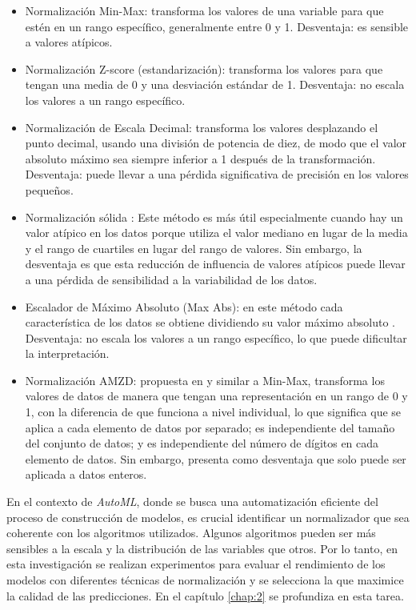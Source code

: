 \begin{itemize}
	\item Normalización Min-Max: transforma los valores de una variable para que estén en un rango específico, generalmente entre 0 y 1. Desventaja: es sensible a valores atípicos.
	\item Normalización Z-score (estandarización): transforma los valores para que tengan una media de 0 y una desviación estándar de 1. Desventaja: no escala los valores a un rango específico.
	\item Normalización de Escala Decimal: transforma los valores desplazando el punto decimal, usando una división de potencia de diez, de modo que el valor absoluto máximo sea siempre inferior a 1 después de la transformación. Desventaja: puede llevar a una pérdida significativa de precisión en los valores pequeños. 
	\item Normalización sólida \citep{polatgil2022investigation}: Este método es más útil especialmente cuando hay un valor atípico en los datos porque utiliza el valor mediano en lugar de la media y el rango de cuartiles en lugar del rango de valores. Sin embargo, la desventaja es que esta reducción de influencia de valores atípicos puede llevar a una pérdida de sensibilidad a la variabilidad de los datos.
	\item Escalador de Máximo Absoluto (Max Abs): en este método cada característica de los datos se obtiene dividiendo su valor máximo absoluto \citep{polatgil2022investigation}. Desventaja: no escala los valores a un rango específico, lo que puede dificultar la interpretación.
	\item Normalización AMZD: propuesta en \citep{patro2015normalization} y similar a Min-Max, transforma los valores de datos de manera que tengan una representación en un rango de 0 y 1, con la diferencia de que funciona a nivel individual, lo que significa que se aplica a cada elemento de datos por separado; es independiente del tamaño del conjunto de datos; y
	es independiente del número de dígitos en cada elemento de datos. Sin embargo,  presenta como desventaja que solo puede ser aplicada a datos enteros.
\end{itemize}

En el contexto de \textit{AutoML}, donde se busca una automatización eficiente del proceso de construcción de modelos, es crucial identificar un normalizador que sea coherente con los algoritmos utilizados. Algunos algoritmos pueden ser más sensibles a la escala y la distribución de las variables que otros. Por lo tanto, en esta investigación se realizan experimentos para evaluar el rendimiento de los modelos con diferentes técnicas de normalización y se selecciona la que maximice la calidad de las predicciones. En el capítulo \ref{chap:2} se profundiza en esta tarea.

